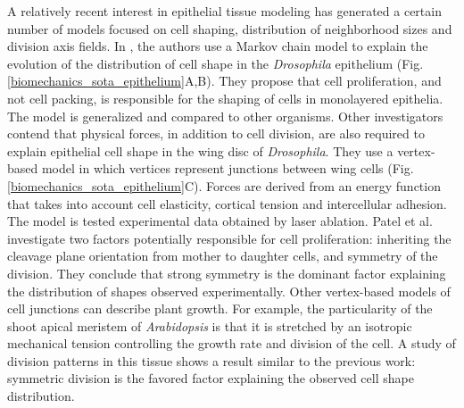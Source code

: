   A relatively recent interest in epithelial tissue modeling has generated a certain number of models focused on cell shaping, distribution of neighborhood sizes and division axis fields. In \cite{Gibson:2006gia}, the authors use a Markov chain model to explain the evolution of the distribution of cell shape in the \textit{Drosophila} epithelium (Fig. \ref{biomechanics_sota_epithelium}A,B). They propose that cell proliferation, and not cell packing, is responsible for the shaping of cells in monolayered epithelia. The model is generalized and compared to other organisms. Other investigators \cite{Farhadifar:2007vj} contend that physical forces, in addition to cell division, are also required to explain epithelial cell shape in the wing disc of \textit{Drosophila}. They use a vertex-based model in which vertices represent junctions between wing cells (Fig. \ref{biomechanics_sota_epithelium}C). Forces are derived from an energy function that takes into account cell elasticity, cortical tension and intercellular adhesion. The model is tested experimental data obtained by laser ablation. Patel et al. \cite{Patel:2009in} investigate two factors potentially responsible for cell proliferation: inheriting the cleavage plane orientation from mother to daughter cells, and symmetry of the division. They conclude that strong symmetry is the dominant factor explaining the distribution of shapes observed experimentally. Other vertex-based models of cell junctions can describe plant growth. For example, the particularity of the shoot apical meristem of \textit{Arabidopsis} is that it is stretched by an isotropic mechanical tension controlling the growth rate and division of the cell. A study of division patterns in this tissue \cite{Sahlin:2010eu} shows a result similar to the previous work: symmetric division is the favored factor explaining the observed cell shape distribution.  

